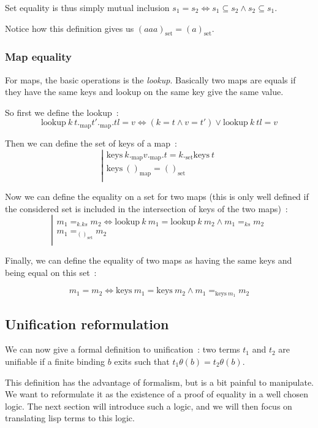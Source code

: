 \documentclass[]{article}
\newcommand{\1}{\mathbbm{1}}
\newcommand{\0}{\mathbbm{0}}
\renewcommand{\subset}{\subseteq}
\begin{document}
Set equality is thus simply mutual inclusion
$s_1= s_2\iff s_1\subset s_2\wedge s_2\subset s_1$.

Notice how this definition gives us $(a a a)_\text{set} = (a)_\text{set}$.

\subsubsection{Map equality}

For maps, the basic operations is the \emph{lookup}. Basically two maps are
equals if they have the same keys and lookup on the same key give the same
value.

So first we define the lookup~:
\[\text{lookup}\ k\ t._\text{map} t'._\text{map}.tl = v \iff
(k = t\wedge v = t')\vee \text{lookup}\ k\ tl = v \]

Then we can define the set of keys of a map~:
\[\left|\begin{array}{l}
    \text{keys}\ k._\text{map}v._\text{map}.t = k._\text{set}\text{keys}\ t \\
    \text{keys}\ ()_\text{map} = ()_\text{set} \\
\end{array}\right.\]

Now we can define the equality on a set for two maps (this is only well defined
if the considered set is included in the intersection of keys of the two maps)~:
\[\left|\begin{array}{l}
    m_1 =_{k.ks} m_2 \iff \text{lookup}\ k\ m_1 = \text{lookup}\ k\ m_2
                          \wedge m_1 =_{ks} m_2 \\
    m_1 =_{()_\text{set}} m_2 \\
\end{array}\right.\]

Finally, we can define the equality of two maps as having the same keys and
being equal on this set~:

\[m_1 = m_2 \iff \text{keys}\ m_1 = \text{keys}\ m_2
                 \wedge m_1 =_{\text{keys}\ m_1} m_2 \]

\subsection{Unification reformulation}

We can now give a formal definition to unification~: two terms $t_1$ and $t_2$ are
unifiable if a finite binding $b$ exits such that $t_1\theta(b) = t_2\theta(b)$.

This definition has the advantage of formalism, but is a bit painful to manipulate.
We want to reformulate it as the existence of a proof of equality in a well
chosen logic. The next section will introduce such a logic, and we will then focus
on translating lisp terms to this logic.
\end{document}
